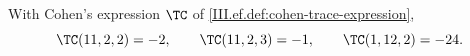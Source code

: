 With Cohen's expression $\TC$ of \cref{III.ef.def:cohen-trace-expression},
\[
  \TC(11,2,2)=-2,\qquad\TC(11,2,3)=-1,\qquad\TC(1,12,2)=-24.
\]
